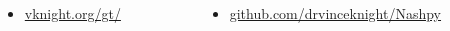 \documentclass{beamer}
\begin{document}
\begin{frame}
   \begin{columns}
        \begin{column}{.4\textwidth}
            \begin{itemize}
                \item
                    \href{https://vknight.org/gt/}{vknight.org/gt/}
            \end{itemize}
        \end{column}
        \begin{column}{.6\textwidth}
            \begin{itemize}
                \item \href{https://github.com/drvinceknight/Nashpy}{github.com/drvinceknight/Nashpy}
            \end{itemize}
        \end{column}
   \end{columns}
\end{frame}
\end{document}
